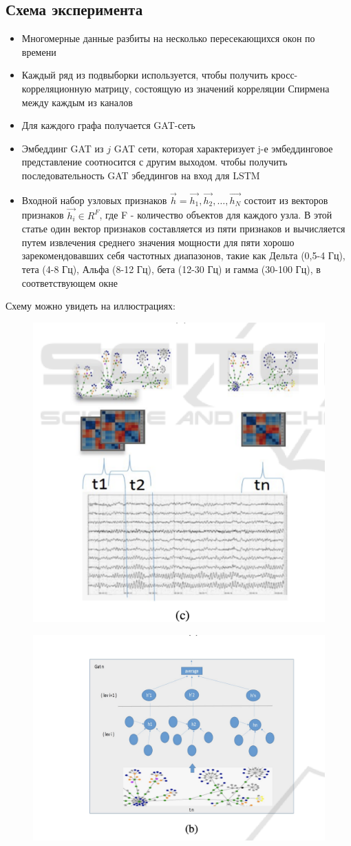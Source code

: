\documentclass[12pt, a4paper, titlepage]{extreport}
\begin{document}
	\subsection*{Схема эксперимента}
		\begin{itemize}
		\item Многомерные данные разбиты на несколько пересекающихся окон по времени
		\item Каждый ряд из подвыборки используется, чтобы получить кросс-корреляционную матрицу, состоящую из значений корреляции Спирмена между каждым из каналов
		\item Для каждого графа получается GAT-сеть
		\item Эмбеддинг  GAT из  $j$ GAT сети, которая характеризует j-е эмбеддинговое представление соотносится с другим выходом. чтобы получить последовательность GAT эбеддингов на вход для LSTM
		\item Входной набор узловых признаков $\vec{h} = {\vec{h_1},\vec{h_2},\dots,\vec{h_N}}$
		состоит из векторов признаков $\vec{h_i} \in R^F$, где F - количество объектов для каждого узла. В этой статье один вектор признаков составляется из пяти признаков и вычисляется путем извлечения среднего значения мощности для пяти хорошо зарекомендовавших себя частотных диапазонов, такие как Дельта (0,5-4 Гц), тета (4-8 Гц), Альфа (8-12 Гц), бета (12-30 Гц) и гамма (30-100 Гц), в соответствующем окне
	\end{itemize}
	Схему можно увидеть на иллюстрациях:
	\begin{figure}
		\centering
		\includegraphics[width=0.7\linewidth]{1_step}
	\end{figure}
	\begin{figure}
		\centering
		\includegraphics[width=0.7\linewidth]{2_step}
	\end{figure}
\end{document}
